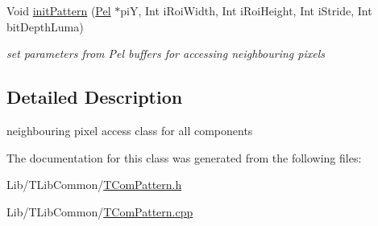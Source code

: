 {\bf }\par
\begin{DoxyCompactItemize}
\item 
\mbox{\label{class_t_com_pattern_a40aabef18769e50d662ae3d51901347d}} 
Void \hyperlink{class_t_com_pattern_a40aabef18769e50d662ae3d51901347d}{init\+Pattern} (\hyperlink{_type_def_8h_af92141699657699b4b547be0c8517541}{Pel} $\ast$piY, Int i\+Roi\+Width, Int i\+Roi\+Height, Int i\+Stride, Int bit\+Depth\+Luma)
\begin{DoxyCompactList}\small\item\em set parameters from Pel buffers for accessing neighbouring pixels \end{DoxyCompactList}\end{DoxyCompactItemize}



\subsection{Detailed Description}
neighbouring pixel access class for all components 

The documentation for this class was generated from the following files\+:\begin{DoxyCompactItemize}
\item 
Lib/\+T\+Lib\+Common/\hyperlink{_t_com_pattern_8h}{T\+Com\+Pattern.\+h}\item 
Lib/\+T\+Lib\+Common/\hyperlink{_t_com_pattern_8cpp}{T\+Com\+Pattern.\+cpp}\end{DoxyCompactItemize}
